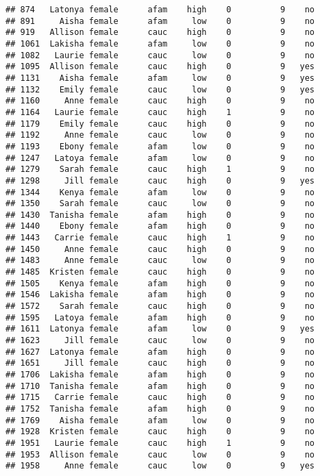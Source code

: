 \documentclass[
]{article}
\begin{document}
\begin{verbatim}
## 874   Latonya female      afam    high    0          9    no
## 891     Aisha female      afam     low    0          9    no
## 919   Allison female      cauc    high    0          9    no
## 1061  Lakisha female      afam     low    0          9    no
## 1082   Laurie female      cauc     low    0          9    no
## 1095  Allison female      cauc    high    0          9   yes
## 1131    Aisha female      afam     low    0          9   yes
## 1132    Emily female      cauc     low    0          9   yes
## 1160     Anne female      cauc    high    0          9    no
## 1164   Laurie female      cauc    high    1          9    no
## 1179    Emily female      cauc    high    0          9    no
## 1192     Anne female      cauc     low    0          9    no
## 1193    Ebony female      afam     low    0          9    no
## 1247   Latoya female      afam     low    0          9    no
## 1279    Sarah female      cauc    high    1          9    no
## 1298     Jill female      cauc    high    0          9   yes
## 1344    Kenya female      afam     low    0          9    no
## 1350    Sarah female      cauc     low    0          9    no
## 1430  Tanisha female      afam    high    0          9    no
## 1440    Ebony female      afam    high    0          9    no
## 1443   Carrie female      cauc    high    1          9    no
## 1450     Anne female      cauc    high    0          9    no
## 1483     Anne female      cauc     low    0          9    no
## 1485  Kristen female      cauc    high    0          9    no
## 1505    Kenya female      afam    high    0          9    no
## 1546  Lakisha female      afam    high    0          9    no
## 1572    Sarah female      cauc    high    0          9    no
## 1595   Latoya female      afam    high    0          9    no
## 1611  Latonya female      afam     low    0          9   yes
## 1623     Jill female      cauc     low    0          9    no
## 1627  Latonya female      afam    high    0          9    no
## 1651     Jill female      cauc    high    0          9    no
## 1706  Lakisha female      afam    high    0          9    no
## 1710  Tanisha female      afam    high    0          9    no
## 1715   Carrie female      cauc    high    0          9    no
## 1752  Tanisha female      afam    high    0          9    no
## 1769    Aisha female      afam     low    0          9    no
## 1928  Kristen female      cauc    high    0          9    no
## 1951   Laurie female      cauc    high    1          9    no
## 1953  Allison female      cauc     low    0          9    no
## 1958     Anne female      cauc     low    0          9   yes

\end{verbatim}
\end{document}
